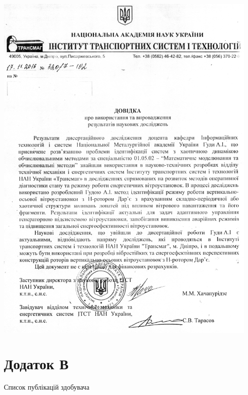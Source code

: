 \documentclass[13pt,d,ukrlang]{vakthesisatu}
\begin{document}
\vspace{-5ex}
\begin{center}
\includegraphics[width=0.98\textwidth]{transmag_dovidka.png}
\end{center}


\clearpage
{}
\chapter*{Додаток В}

\vspace{-7ex}
\begin{center}
  Список публікацій здобувача
\end{center}


\end{document}
